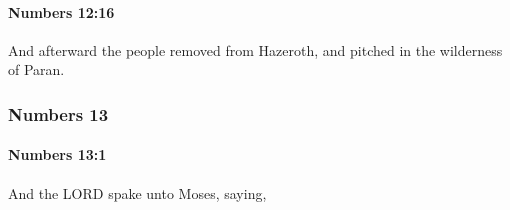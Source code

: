 		\paragraph{Numbers 12:16} %
			\label{NUMBERS-12-16}

			And afterward the people removed from Hazeroth, and pitched in the wilderness of Paran.

	\subsubsection{Numbers 13} %
		\label{NUMBERS-13}

		\paragraph{Numbers 13:1} %
			\label{NUMBERS-13-1}

			And the LORD spake unto Moses, saying,


